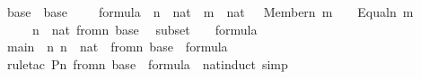 \begin{isabellebody}
\isamarkupfalse%
\ {\isasymDelta}{}{\isacharunderscore}{\kern0pt}base\ \ {\isachardoublequoteopen}{\isasymDelta}{}{\isacharunderscore}{\kern0pt}base\ {\isasymequiv}\ {\isacharbraceleft}{\kern0pt}\ {\isasymphi}\ {\isasymin}\ formula{\isachardot}{\kern0pt}\ {\isasymexists}\ n\ {\isasymin}\ nat{\isachardot}{\kern0pt}\ {\isasymexists}\ m\ {\isasymin}\ nat{\isachardot}{\kern0pt}\ {\isasymphi}\ {\isacharequal}{\kern0pt}\ Member{\isacharparenleft}{\kern0pt}n{\isacharcomma}{\kern0pt}\ m{\isacharparenright}{\kern0pt}\ {\isasymor}\ {\isasymphi}\ {\isacharequal}{\kern0pt}\ Equal{\isacharparenleft}{\kern0pt}n{\isacharcomma}{\kern0pt}\ m{\isacharparenright}{\kern0pt}\ {\isacharbraceright}{\kern0pt}{\isachardoublequoteclose}\ \isanewline
\isanewline
{}\isamarkupfalse%
\ {\isasymDelta}{}\ \ {\isachardoublequoteopen}{\isasymDelta}{}\ {\isasymequiv}\ {\isasymUnion}n\ {\isasymin}\ nat{\isachardot}{\kern0pt}\ {\isasymDelta}{}{\isacharunderscore}{\kern0pt}from{\isacharcircum}{\kern0pt}n\ {\isacharparenleft}{\kern0pt}{\isasymDelta}{}{\isacharunderscore}{\kern0pt}base{\isacharparenright}{\kern0pt}{\isachardoublequoteclose}\ \isanewline
\isanewline
{}\isamarkupfalse%
\ {\isasymDelta}{}{\isacharunderscore}{\kern0pt}subset\ {\isacharcolon}{\kern0pt}\ {\isachardoublequoteopen}{\isasymDelta}{}\ {\isasymsubseteq}\ formula{\isachardoublequoteclose}\ \isanewline
%
\isadelimproof
%
\endisadelimproof
%
\isatagproof
{}\isamarkupfalse%
\ {\isacharminus}{\kern0pt}\isanewline
\ \ \isamarkupfalse%
\ main\ {\isacharcolon}{\kern0pt}\ {\isachardoublequoteopen}{\isasymAnd}n{\isachardot}{\kern0pt}\ n\ {\isasymin}\ nat\ {\isasymLongrightarrow}\ {\isasymDelta}{}{\isacharunderscore}{\kern0pt}from{\isacharcircum}{\kern0pt}n\ {\isacharparenleft}{\kern0pt}{\isasymDelta}{}{\isacharunderscore}{\kern0pt}base{\isacharparenright}{\kern0pt}\ {\isasymsubseteq}\ formula{\isachardoublequoteclose}\ \isanewline
\ \ \ \ \isamarkupfalse%
\ {\isacharparenleft}{\kern0pt}rule{\isacharunderscore}{\kern0pt}tac\ P{\isacharequal}{\kern0pt}{\isachardoublequoteopen}{\isasymlambda}n{\isachardot}{\kern0pt}\ {\isasymDelta}{}{\isacharunderscore}{\kern0pt}from{\isacharcircum}{\kern0pt}n\ {\isacharparenleft}{\kern0pt}{\isasymDelta}{}{\isacharunderscore}{\kern0pt}base{\isacharparenright}{\kern0pt}\ {\isasymsubseteq}\ formula{\isachardoublequoteclose}\ \ nat{\isacharunderscore}{\kern0pt}induct{\isacharcomma}{\kern0pt}\ simp{\isacharparenright}{\kern0pt}\isanewline

\end{isabellebody}
